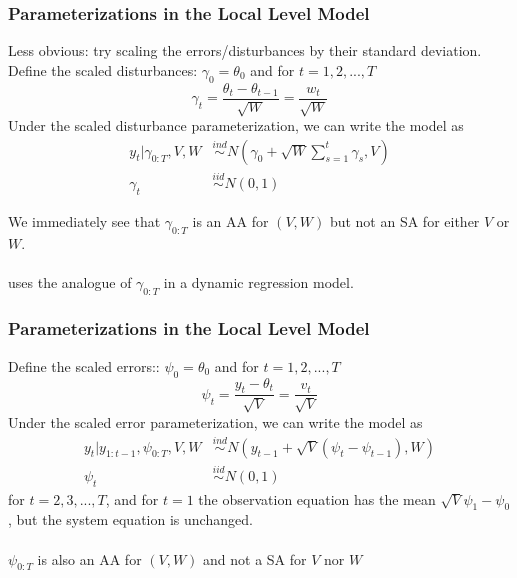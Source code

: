 \documentclass[xcolor=dvipsnames]{beamer}
\begin{document}
\begin{frame}
  \frametitle{Parameterizations in the Local Level Model}
Less obvious: try scaling the errors/disturbances by their standard deviation. Define the scaled disturbances: $\gamma_0=\theta_0$ and for $t=1,2,...,T$ 
    \[
    \gamma_t =\frac{\theta_t - \theta_{t-1}}{\sqrt{W}} = \frac{w_t}{\sqrt{W}}
    \]
    \pause
Under the scaled disturbance parameterization, we can write the model as
\begin{align*}
  y_t|\gamma_{0:T},V,W & \stackrel{ind}{\sim} N(\gamma_0 + \sqrt{W}\textstyle\sum_{s=1}^t\gamma_s, V)\\
  \gamma_t & \stackrel{iid}{\sim}N(0,1)
\end{align*}

We immediately see that $\gamma_{0:T}$ is an AA for $(V,W)$ but not an SA for either $V$ or $W$.\\~\\

\citet{fruhwirth2004efficient} uses the analogue of $\gamma_{0:T}$ in a dynamic regression model.
\end{frame}

\begin{frame}
  \frametitle{Parameterizations in the Local Level Model}
  Define the scaled errors:: $\psi_0=\theta_0$ and for $t=1,2,...,T$ 
    \[
    \psi_t = \frac{y_t - \theta_{t}}{\sqrt{V}} = \frac{v_t}{\sqrt{V}}
    \]
    \pause
  Under the scaled error parameterization, we can write the model as
\begin{align*}
  y_t|y_{1:t-1},\psi_{0:T},V,W & \stackrel{ind}{\sim} N(y_{t-1} + \sqrt{V}(\psi_t - \psi_{t-1}), W)\\
  \psi_t & \stackrel{iid}{\sim}N(0,1)
\end{align*}
for $t=2,3,...,T$, and for $t=1$ the observation equation has the mean $\sqrt{V}\psi_1 - \psi_0$, but the system equation is unchanged.\\~\\

$\psi_{0:T}$ is also an AA for $(V,W)$ and not a SA for $V$ nor $W$
\end{frame}
\end{document}

